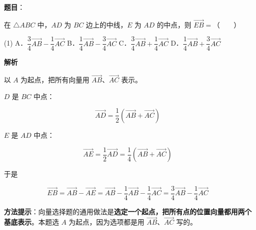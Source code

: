 \begin{answer}

\textbf{题目}：

在 $\triangle ABC$ 中，$AD$ 为 $BC$ 边上的中线，$E$ 为 $AD$ 的中点，则 $\overrightarrow{EB}=$\mbox{（　　）}

\begin{gkopts}(1)
\task A．$\dfrac34\overrightarrow{AB}-\dfrac14\overrightarrow{AC}$
\task B．$\dfrac14\overrightarrow{AB}-\dfrac34\overrightarrow{AC}$
\task C．$\dfrac34\overrightarrow{AB}+\dfrac14\overrightarrow{AC}$
\task D．$\dfrac14\overrightarrow{AB}+\dfrac34\overrightarrow{AC}$
\end{gkopts}

\textbf{解析}

以 $A$ 为起点，把所有向量用 $\overrightarrow{AB}$、$\overrightarrow{AC}$ 表示。

$D$ 是 $BC$ 中点：

\nopagebreak[4]
\[\overrightarrow{AD}=\frac12\left(\overrightarrow{AB}+\overrightarrow{AC}\right)\]

$E$ 是 $AD$ 中点：

\nopagebreak[4]
\[\overrightarrow{AE}=\frac12\overrightarrow{AD}=\frac14\left(\overrightarrow{AB}+\overrightarrow{AC}\right)\]

于是

\nopagebreak[4]
\[\overrightarrow{EB}=\overrightarrow{AB}-\overrightarrow{AE}=\overrightarrow{AB}-\frac14\overrightarrow{AB}-\frac14\overrightarrow{AC}=\frac34\overrightarrow{AB}-\frac14\overrightarrow{AC}\]

\begin{gktip}
\textbf{方法提示}：向量选择题的通用做法是\textbf{选定一个起点，把所有点的位置向量都用两个基底表示}。本题选 $A$ 为起点，因为选项都是用 $\overrightarrow{AB}$、$\overrightarrow{AC}$ 写的。
\end{gktip}


\par\medskip

\end{answer}
